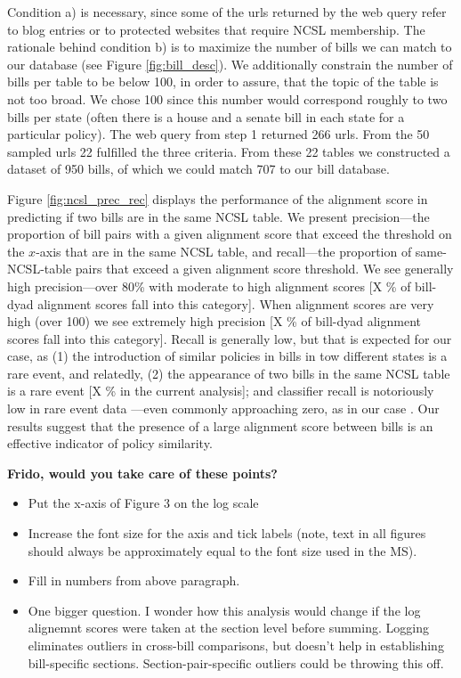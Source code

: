 \documentclass[12pt]{article} %
\begin{document}
Condition a) is necessary, since some of the urls returned by the web query refer to blog entries or to protected websites that require NCSL membership. The rationale behind condition b) is to maximize the number of bills we can match to our database (see Figure \ref{fig:bill_desc}). We additionally constrain the number of bills per table to be below 100, in order to assure, that the topic of the table is not too broad. We chose 100 since this number would correspond roughly to two bills per state (often there is a house and a senate bill in each state for a particular policy).
The web query from step 1 returned 266 urls. From the 50 sampled urls 22 fulfilled the three criteria. From these 22 tables we constructed a dataset of 950 bills, of which we could match 707 to our bill database.

Figure \ref{fig:ncsl_prec_rec} displays the performance of the alignment score in predicting if two bills are in the same NCSL table. We present precision---the proportion of bill pairs with a given alignment score that exceed the threshold on the $x$-axis that are in the same NCSL table, and recall---the proportion of same-NCSL-table pairs that exceed a given alignment score threshold. We see generally high precision---over 80\% with moderate to high alignment scores [X \% of bill-dyad alignment scores fall into this category]. When alignment scores are very high (over 100) we see extremely high precision [X \% of bill-dyad alignment scores fall into this category]. Recall is generally low, but that is expected for our case, as (1) the introduction of similar policies in bills in tow different states is a rare event, and relatedly, (2) the appearance of two bills in the same NCSL table is a rare event [X \% in the current analysis]; and classifier recall is notoriously low in rare event data \citep{weiss2000learning}---even commonly approaching zero, as in our case \citep{weiss2004mining}. Our results suggest that the presence of a large alignment score between bills is an effective indicator of policy similarity.

{\bf Frido, would you take care of these points?}
\begin{itemize}
\item Put the x-axis of Figure 3 on the log scale
\item Increase the font size for the axis and tick labels (note, text in all figures should always be approximately equal to the font size used in the MS).
\item Fill in numbers from above paragraph.
\item One bigger question. I wonder how this analysis would change if the log alignemnt scores were taken at the section level before summing. Logging eliminates outliers in cross-bill comparisons, but doesn't help in establishing bill-specific sections. Section-pair-specific outliers could be throwing this off.
\end{itemize}
\end{document}
